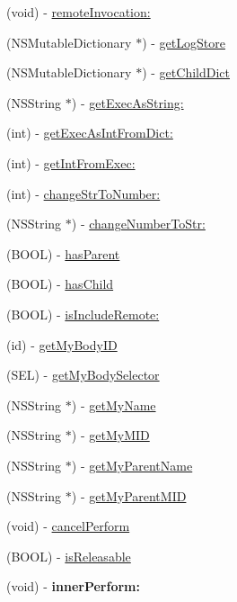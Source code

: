 \begin{DoxyCompactItemize}
(void) -\/ \hyperlink{interface_messenger_system_aaaa066451fb04c37c88e6a7efc94c63e}{remoteInvocation:}
\item 
(NSMutableDictionary $\ast$) -\/ \hyperlink{interface_messenger_system_a857e1c7932fdb366b52b687832c8e0bf}{getLogStore}
\item 
(NSMutableDictionary $\ast$) -\/ \hyperlink{interface_messenger_system_a057d907e4e7325c927580ace6701f95c}{getChildDict}
\item 
(NSString $\ast$) -\/ \hyperlink{interface_messenger_system_a1a0013cb76d7f354e7d71e09e0456766}{getExecAsString:}
\item 
(int) -\/ \hyperlink{interface_messenger_system_aef3cf1f4d71c77f66e6053dcd277beba}{getExecAsIntFromDict:}
\item 
(int) -\/ \hyperlink{interface_messenger_system_a881655597ee31052ca7cd72acd1343c2}{getIntFromExec:}
\item 
(int) -\/ \hyperlink{interface_messenger_system_a9c32da2a99a87a32c2567b29b4d411ac}{changeStrToNumber:}
\item 
(NSString $\ast$) -\/ \hyperlink{interface_messenger_system_ace36dcb764d249819d4ea85fac0afe5c}{changeNumberToStr:}
\item 
(BOOL) -\/ \hyperlink{interface_messenger_system_a4ab801cff2356929a18a551b3537f435}{hasParent}
\item 
(BOOL) -\/ \hyperlink{interface_messenger_system_a9db1bcbbaf0abb9e8e1af5a2aa5bf9fa}{hasChild}
\item 
(BOOL) -\/ \hyperlink{interface_messenger_system_a975357de1acaa17f15d90e67d0203ff4}{isIncludeRemote:}
\item 
(id) -\/ \hyperlink{interface_messenger_system_a7ebd928ddb4092333370af98d34095ed}{getMyBodyID}
\item 
(SEL) -\/ \hyperlink{interface_messenger_system_a0c021c0bc0628174e8b16f664205ebf6}{getMyBodySelector}
\item 
(NSString $\ast$) -\/ \hyperlink{interface_messenger_system_a8d6c34458dcb7c44337b68b2c47c9050}{getMyName}
\item 
(NSString $\ast$) -\/ \hyperlink{interface_messenger_system_a53fb306c1c478aafd66a039cf08e9f53}{getMyMID}
\item 
(NSString $\ast$) -\/ \hyperlink{interface_messenger_system_a8480affbc74b87d15b301d5b32681a70}{getMyParentName}
\item 
(NSString $\ast$) -\/ \hyperlink{interface_messenger_system_a59c153b480be68325af6a66f18cecd0b}{getMyParentMID}
\item 
(void) -\/ \hyperlink{interface_messenger_system_a6ffde31c3597bd083b47e30d26eb926f}{cancelPerform}
\item 
(BOOL) -\/ \hyperlink{interface_messenger_system_adcebdb1f9788a0bb75bb4c0433849ace}{isReleasable}
\item 
\hypertarget{interface_messenger_system_acd15a25f39e26b450bb1c33edd1f2d51}{
(void) -\/ {\bfseries innerPerform:}}
\label{interface_messenger_system_acd15a25f39e26b450bb1c33edd1f2d51}


\end{DoxyCompactItemize}
